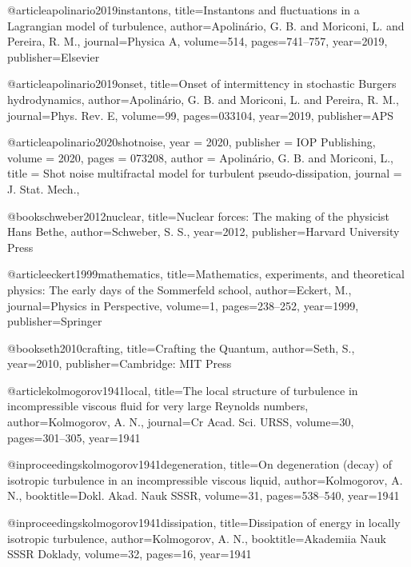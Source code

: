 
  @article{apolinario2019instantons,
    title={{Instantons and fluctuations in a Lagrangian model of turbulence}},
    author={Apolin{\'a}rio, G. B. and Moriconi, L. and Pereira, R. M.},
    journal={Physica A},
    volume={514},
    pages={741--757},
    year={2019},
    publisher={Elsevier}
  }

  @article{apolinario2019onset,
    title={{Onset of intermittency in stochastic Burgers hydrodynamics}},
    author={Apolin{\'a}rio, G. B. and Moriconi, L. and Pereira, R. M.},
    journal={Phys. Rev. E},
    volume={99},
    pages={033104},
    year={2019},
    publisher={APS}
  }
  
  @article{apolinario2020shotnoise,
	year = {2020},
	publisher = {{IOP} Publishing},
	volume = {2020},
	pages = {073208},
	author = {Apolin{\'{a}}rio, G. B. and Moriconi, L.},
	title = {Shot noise multifractal model for turbulent pseudo-dissipation},
	journal = {J. Stat. Mech.},
 }

  @book{schweber2012nuclear,
    title={{Nuclear forces: The making of the physicist Hans Bethe}},
    author={Schweber, S. S.},
    year={2012},
    publisher={Harvard University Press}
  }

  @article{eckert1999mathematics,
    title={{Mathematics, experiments, and theoretical physics: The early days of the Sommerfeld school}},
    author={Eckert, M.},
    journal={Physics in Perspective},
    volume={1},
    pages={238--252},
    year={1999},
    publisher={Springer}
  }

  @book{seth2010crafting,
    title={{Crafting the Quantum}},
    author={Seth, S.},
    year={2010},
    publisher={Cambridge: MIT Press}
  }


  @article{kolmogorov1941local,
    title={{The local structure of turbulence in incompressible viscous fluid for very large Reynolds numbers}},
    author={Kolmogorov, A. N.},
    journal={Cr Acad. Sci. URSS},
    volume={30},
    pages={301--305},
    year={1941}
  }

  @inproceedings{kolmogorov1941degeneration,
    title={{On degeneration (decay) of isotropic turbulence in an incompressible viscous liquid}},
    author={Kolmogorov, A. N.},
    booktitle={Dokl. Akad. Nauk SSSR},
    volume={31},
    pages={538--540},
    year={1941}
  }

  @inproceedings{kolmogorov1941dissipation,
    title={{Dissipation of energy in locally isotropic turbulence}},
    author={Kolmogorov, A. N.},
    booktitle={Akademiia Nauk SSSR Doklady},
    volume={32},
    pages={16},
    year={1941}
  }

